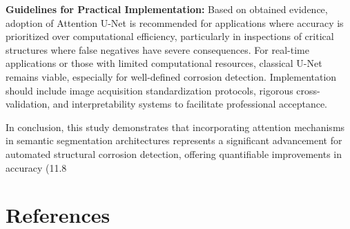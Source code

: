 \documentclass[12pt,a4paper,twoside]{article}
\begin{document}
\textbf{Guidelines for Practical Implementation:} Based on obtained evidence, adoption of Attention U-Net is recommended for applications where accuracy is prioritized over computational efficiency, particularly in inspections of critical structures where false negatives have severe consequences. For real-time applications or those with limited computational resources, classical U-Net remains viable, especially for well-defined corrosion detection. Implementation should include image acquisition standardization protocols, rigorous cross-validation, and interpretability systems to facilitate professional acceptance.

In conclusion, this study demonstrates that incorporating attention mechanisms in semantic segmentation architectures represents a significant advancement for automated structural corrosion detection, offering quantifiable improvements in accuracy (11.8%



\section{References}
\label{sec:references}



\end{document}
